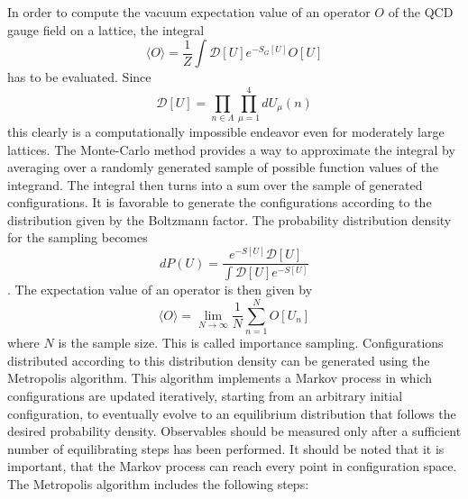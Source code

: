 \documentclass[graybox]{svmult}
\begin{document}
In order to compute the vacuum expectation value of an operator $O$ of the QCD gauge field on a lattice, the integral
\begin{equation}
\langle O \rangle = \frac 1 Z \int \mathcal{D}[U] e^{-S_G[U]} O[U]
\end{equation}
has to be evaluated. Since
\begin{equation}
\mathcal{D}[U] = \prod_{n \in \Lambda} \prod_{\mu = 1}^4 dU_{\mu}(n)
\end{equation}
this clearly is a computationally impossible endeavor even for moderately large lattices. The Monte-Carlo method provides a way to approximate the integral by averaging over a randomly generated sample of possible function values of the integrand. The integral then turns into a sum over the sample of generated configurations. It is favorable to generate the configurations according to the distribution given by the Boltzmann factor. The probability distribution density for the sampling becomes
\begin{equation}
dP(U) = \frac{e^{-S[U]}\mathcal{D}[U]}{\int \mathcal{D}[U] e^{-S[U]}}
\end{equation}.
The expectation value of an operator is then given by
\begin{equation}
\langle O \rangle = \lim_{N \rightarrow \infty} \frac{1}{N} \sum_{n = 1}^N O[U_n]
\end{equation}
where $N$ is the sample size. This is called importance sampling.
Configurations distributed according to this distribution density can be generated using the Metropolis algorithm. This algorithm implements a Markov process in which configurations are updated iteratively, starting from an arbitrary initial configuration, to eventually evolve to an equilibrium distribution that follows the desired probability density. Observables should be measured only after a sufficient number of equilibrating steps has been performed. It should be noted that it is important, that the Markov process can reach every point in configuration space. The Metropolis algorithm includes the following steps:
\end{document}
